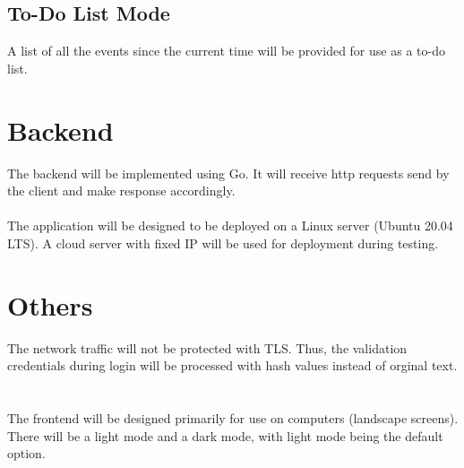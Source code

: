 \documentclass{article}[12pt]
\begin{document}
\subsection{To-Do List Mode}
A list of all the events since the current time will be provided for use as a to-do list.
~\\



\section{Backend}
The backend will be implemented using Go.
It will receive http requests send by the client and make response accordingly.
~\\~\\
The application will be designed to be deployed on a Linux server (Ubuntu 20.04 LTS).
A cloud server with fixed IP will be used for deployment during testing.



\section{Others}
The network traffic will not be protected with TLS.
Thus, the validation credentials during login will be processed with hash values instead of orginal text.
~\\~\\
The frontend will be designed primarily for use on computers (landscape screens).
There will be a light mode and a dark mode, with light mode being the default option.
\end{document}
